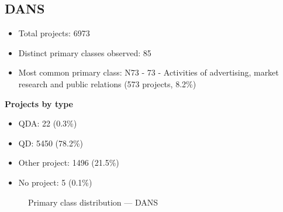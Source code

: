 \subsection{DANS}

\begin{itemize}
    \item Total projects: 6973
    \item Distinct primary classes observed: 85
    \item Most common primary class: N73 - 73 - Activities of advertising, market research and public relations (573 projects, 8.2\%)
\end{itemize}
\textbf{Projects by type}
\begin{itemize}
    \item QDA: 22 (0.3\%)
    \item QD: 5450 (78.2\%)
    \item Other project: 1496 (21.5\%)
    \item No project: 5 (0.1\%)
\end{itemize}

\begin{figure}[H]
    \centering
    
    \caption{Primary class distribution --- DANS}
\end{figure}

